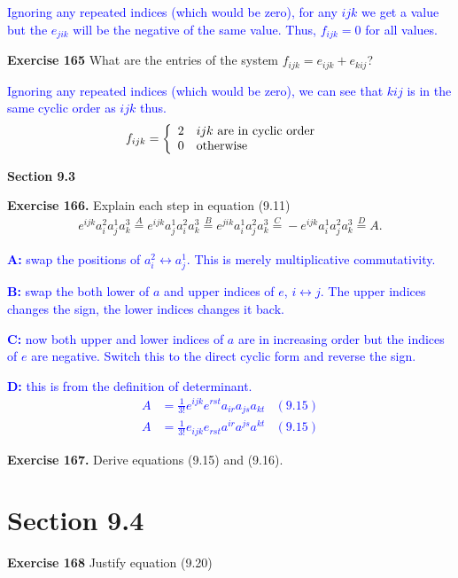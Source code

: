 \documentclass[12pt,a4paper]{report}
\newcommand{\BLUE}[1]{\textcolor{blue}{#1}}
\begin{document}
\begin{description}
\BLUE{Ignoring any repeated indices (which would be zero), for any $ijk$ we get a value but the $e_{jik}$ will be the negative of the same value.  Thus, $f_{ijk}=0$ for all values.
}

\item \textbf{Exercise 165} What are the entries of the system $f_{ijk}=e_{ijk}+e_{kij}$?

\BLUE{Ignoring any repeated indices (which would be zero), we can see that $kij$ is in the same cyclic order as $ijk$ thus. 
\begin{align*}
	f_{ijk} &= \left \{ \begin{array}{ll} 2 & ijk \text{ are in cyclic order}\\ 0 & \text{otherwise} \end{array} \right .
\end{align*}
}

\HLINE
\noindent\textbf{Section 9.3}

\item \textbf{Exercise 166.} Explain each step in equation (9.11)
\begin{align*}
	e^{ijk}a_i^2a_j^1a_k^3 \overset{A}= e^{ijk}a_j^1a_i^2a_k^3\overset{B}=e^{jik}a_i^1a_j^2a_k^3\overset{C}=-e^{ijk}a_i^1a_j^2a_k^3 \overset{D}= A.
\end{align*}
\BLUE{\begin{description}
	\item \textbf{A: }swap the positions of $a_i^2 \leftrightarrow a_j^1$.  This is merely multiplicative commutativity.
	\item \textbf{B: }swap the both lower of $a$ and upper indices of $e$, $i \leftrightarrow j$. The upper indices changes the sign, the lower indices changes it back.
	\item \textbf{C: }now both upper and lower indices of $a$ are in increasing order but the indices of $e$ are negative.  Switch this to the direct cyclic form and reverse the sign.
	\item \textbf{D: }this is from the definition of determinant.
	\begin{align*}
		A &= \frac{1}{3!}e^{ijk}e^{rst}a_{ir}a_{js}a_{kt} & (9.15) \\
		A &= \frac{1}{3!}e_{ijk}e_{rst}a^{ir}a^{js}a^{kt} & (9.15)
	\end{align*}
\end{description}
}
\item \textbf{Exercise 167.} Derive equations (9.15) and (9.16).

\section{Section 9.4}
\item \textbf{Exercise 168} Justify equation (9.20)


\end{description}
\end{document}

